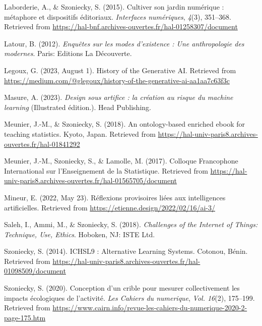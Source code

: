 \documentclass[
  a4paper,
  DIV=11,
  numbers=noendperiod]{scrreprt}
\newlength{\cslhangindent}
\newenvironment{CSLReferences}[2] %
 {\begin{list}{}{%
  \setlength{\itemindent}{0pt}
  \setlength{\leftmargin}{0pt}
  \setlength{\parsep}{0pt}
  \ifodd #1
   \setlength{\leftmargin}{\cslhangindent}
   \setlength{\itemindent}{-1\cslhangindent}
  \fi
  \setlength{\itemsep}{#2\baselineskip}}}
 {\end{list}}
\begin{document}
\begin{CSLReferences}{1}{0}
Laborderie, A., \& Szoniecky, S. (2015). Cultiver son jardin numérique :
métaphore et dispositifs éditoriaux. \emph{Interfaces numériques},
\emph{4}(3), 351--368. Retrieved from
\url{https://hal-bnf.archives-ouvertes.fr/hal-01258307/document}

Latour, B. (2012). \emph{Enquêtes sur les modes d'existence : Une
anthropologie des modernes}. Paris: Editions La Découverte.

Legoux, G. (2023, August 1). History of the Generative AI. Retrieved
from
\url{https://medium.com/@glegoux/history-of-the-generative-ai-aa1aa7c63f3c}

Masure, A. (2023). \emph{Design sous artifice : la création au risque du
machine learning} (Illustrated édition.). Head Publishing.

Meunier, J.-M., \& Szoniecky, S. (2018). An ontology-based enriched
ebook for teaching statistics. Kyoto, Japan. Retrieved from
\url{https://hal-univ-paris8.archives-ouvertes.fr/hal-01841292}

Meunier, J.-M., Szoniecky, S., \& Lamolle, M. (2017). Colloque
Francophone International sur l{'}Enseignement de la Statistique.
Retrieved from
\url{https://hal-univ-paris8.archives-ouvertes.fr/hal-01565705/document}

Mineur, E. (2022, May 23). Réflexions provisoires liées aux
intelligences artificielles. Retrieved from
\url{https://etienne.design/2022/02/16/ai-3/}

Saleh, I., Ammi, M., \& Szoniecky, S. (2018). \emph{Challenges of the
Internet of Things: Technique, Use, Ethics}. Hoboken, NJ: ISTE Ltd.

Szoniecky, S. (2014). ICHSL9 : Alternative Learning Systems. Cotonou,
Bénin. Retrieved from
\url{https://hal-univ-paris8.archives-ouvertes.fr/hal-01098509/document}

Szoniecky, S. (2020). Conception d{'}un crible pour mesurer
collectivement les impacts écologiques de l{'}activité. \emph{Les
Cahiers du numerique}, \emph{Vol. 16}(2), 175--199. Retrieved from
\url{https://www.cairn.info/revue-les-cahiers-du-numerique-2020-2-page-175.htm}


\end{CSLReferences}
\end{document}
